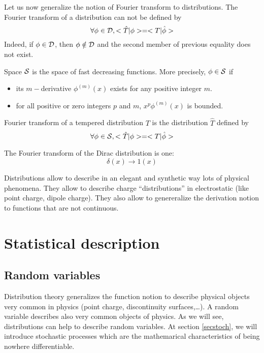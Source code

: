 \documentclass[12pt]{book}
\begin{document}
Let us now generalize the notion of Fourier transform to
distributions. The Fourier transform of a distribution can not be defined by
\begin{equation}
\forall \phi\in{\cal D}, <\hat T|\phi>=<T|\hat \phi>
\end{equation}
Indeed, if $\phi\in{\cal D}$, then $\phi\notin{\cal D}$ and the second member
of previous equality does not exist.
\begin{defn}
Space ${\cal S}$ is the space of fast decreasing functions. More precisely,
$\phi\in{\cal S}$ if
\begin{itemize}
\item  its $m-$derivative  $\phi^{(m)}(x)$ exists for any positive integer $m$.
\item for all positive or zero integers $p$ and $m$,
$x^p\phi^{(m)}(x)$ is bounded.
\end{itemize}
\end{defn}
\begin{defn}
Fourier transform of a tempered distribution $T$ is the distribution $\hat T$
defined by 
\begin{equation}
\forall \phi\in{\cal S}, <\hat T|\phi>=<T|\hat \phi>
\end{equation}
\end{defn}
The Fourier transform of the Dirac distribution is one:
\begin{equation}
\delta(x) \rightarrow 1(x)
\end{equation}

Distributions allow to describe in an elegant and
synthetic way lots of physical phenomena. They allow to describe charge
``distributions'' in electrostatic (like point charge, dipole charge). They
also allow to genereralize the derivation notion to functions that are not
continuous. 

\section{Statistical description}
\subsection{Random variables}
Distribution theory generalizes the function notion to
describe physical objects very common in
physics (point charge, discontinuity
surfaces,\dots). A random variable describes also very common objects
of physics. As we will see, distributions can help to describe random
variables. At section \ref{secstoch}, we will introduce stochastic
processes which are the mathemarical characteristics of being nowhere
differentiable. 
\end{document}
